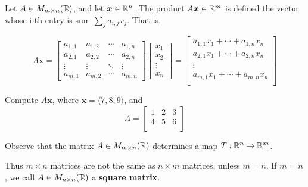 \begin{definition}
    
    Let $A \in M_{m \times n}(\mathbb{R})$, and let $\bm{x}\in \mathbb{R}^n$.  The product $A\bm{x} \in \mathbb{R}^m$ is defined the vector whose i-th entry is sum $\sum_j a_{i,j}x_j$. That is, 
    
        \begin{equation*}
A\bm{x} = 
\begin{bmatrix}
a_{1,1} & a_{1,2} & \cdots & a_{1,n} \\
a_{2,1} & a_{2,2} & \cdots & a_{2,n} \\
\vdots  & \vdots  & \ddots & \vdots  \\
a_{m,1} & a_{m,2} & \cdots & a_{m,n} 
\end{bmatrix}
\begin{bmatrix}
x_1 \\
x_2 \\
\vdots   \\
x_n
\end{bmatrix}
= \begin{bmatrix}
a_{1,1}x_1 + \cdots + a_{1,n}x_n\\
a_{2,1}x_1 + \cdots + a_{2,n}x_n\\
\vdots   \\
a_{m,1}x_1 + \cdots + a_{m,n}x_n\\
\end{bmatrix}
\end{equation*}
    
\end{definition}

\begin{example}
    Compute $A\bm{x}$, where $\bm{x} = \langle 7, 8, 9\rangle$, and \begin{equation*}
A = 
\begin{bmatrix}
1 & 2 & 3 \\
4 & 5 & 6 \\
\end{bmatrix}
\end{equation*}
\end{example}

\begin{proposition}
    Observe that the matrix $A\in M_{m \times n}(\mathbb{R})$ determines a map $T: \mathbb{R}^n \to \mathbb{R}^m$.
\end{proposition}

Thus $m \times n$ matrices are not the same as $n \times m$ matrices, unless $m=n$. If $m=n$, we call $A\in M_{n \times n}(\mathbb{R})$ a \textbf{square matrix}.

